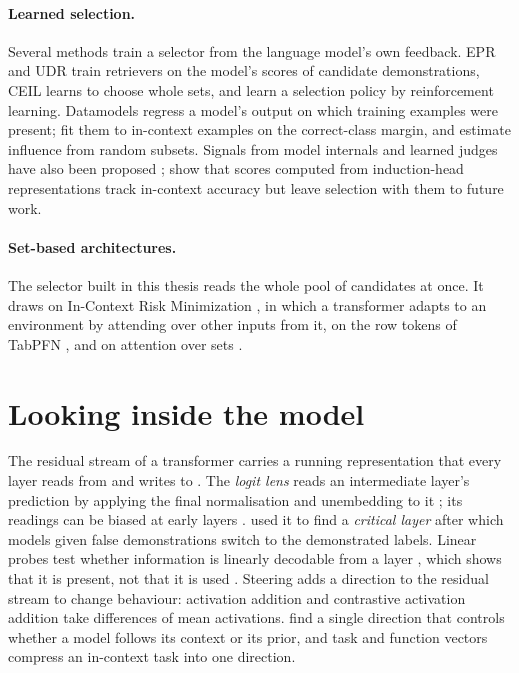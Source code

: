 \paragraph{Learned selection.}
Several methods train a selector from the language model's own feedback.
EPR \citep{rubin2022learning} and UDR \citep{li2023unified} train retrievers on the model's scores of candidate demonstrations, CEIL \citep{ye2023compositional} learns to choose whole sets, and \citet{zhang2022active} learn a selection policy by reinforcement learning.
Datamodels \citep{ilyas2022datamodels} regress a model's output on which training examples were present; \citet{chang2023data} fit them to in-context examples on the correct-class margin, and \citet{nguyen2023incontext} estimate influence from random subsets.
Signals from model internals and learned judges have also been proposed \citep{kato2025affinity,wang2026disp}; \citet{kato2025affinity} show that scores computed from induction-head representations track in-context accuracy but leave selection with them to future work.

\paragraph{Set-based architectures.}
The selector built in this thesis reads the whole pool of candidates at once.
It draws on In-Context Risk Minimization \citep{gupta2024context}, in which a transformer adapts to an environment by attending over other inputs from it, on the row tokens of TabPFN \citep{hollmann2023tabpfn}, and on attention over sets \citep{lee2019set}.

\section{Looking inside the model}
\label{sec:bg-mech}

The residual stream of a transformer \citep{vaswani2017attention} carries a running representation that every layer reads from and writes to \citep{elhage2021mathematical}.
The \emph{logit lens} reads an intermediate layer's prediction by applying the final normalisation and unembedding to it \citep{nostalgebraist2020logit}; its readings can be biased at early layers \citep{belrose2023eliciting}.
\citet{halawi2024overthinking} used it to find a \emph{critical layer} after which models given false demonstrations switch to the demonstrated labels.
Linear probes test whether information is linearly decodable from a layer \citep{alain2017understanding}, which shows that it is present, not that it is used \citep{belinkov2022probing}.
Steering adds a direction to the residual stream to change behaviour: activation addition \citep{turner2023activation} and contrastive activation addition \citep{rimsky2024steering} take differences of mean activations.
\citet{minder2025controllable} find a single direction that controls whether a model follows its context or its prior, and task and function vectors \citep{hendel2023incontext,todd2024function} compress an in-context task into one direction.

